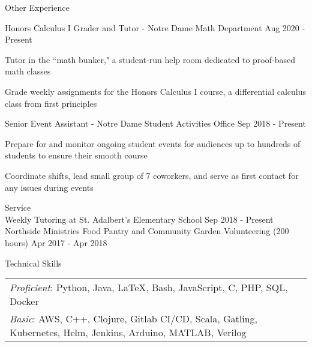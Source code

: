 \documentclass[10pt]{resume} %
\begin{document}
\begin{rSection}{Other Experience}

\begin{rSubsection}{ Honors Calculus I Grader and Tutor - Notre Dame Math Department }{ Aug 2020 - Present }{}{}
\item Tutor in the ``math bunker," a student-run help room dedicated to proof-based math classes
\item Grade weekly assignments for the Honors Calculus I course, a differential calculus class from first principles
\end{rSubsection}


\begin{rSubsection}{ Senior Event Assistant - Notre Dame Student Activities Office }{ Sep 2018 - Present }{}{}
\item Prepare for and monitor ongoing student events for audiences up to hundreds of students to ensure their smooth course
\item Coordinate shifts, lead small group of 7 coworkers, and serve as first contact for any issues during events
\end{rSubsection}

\end{rSection}

\begin{rSection}{Service}
\\ { Weekly Tutoring at St. Adalbert's Elementary School } \hfill { Sep 2018 - Present }
\\ { Northside Ministries Food Pantry and Community Garden Volunteering (200 hours) } \hfill { Apr 2017 - Apr 2018}
\end{rSection}


\begin{rSection}{Technical Skills}
\begin{tabular}{ @{} @{\hspace{1ex}} ll }
{\em Proficient}: Python, Java, LaTeX, Bash, JavaScript, C, PHP, SQL, Docker \\ %
{\em Basic}: AWS, C++, Clojure, Gitlab CI/CD, Scala, Gatling, Kubernetes, Helm, Jenkins, Arduino, MATLAB, Verilog  \\

\end{tabular}

\end{rSection}
\end{document}
